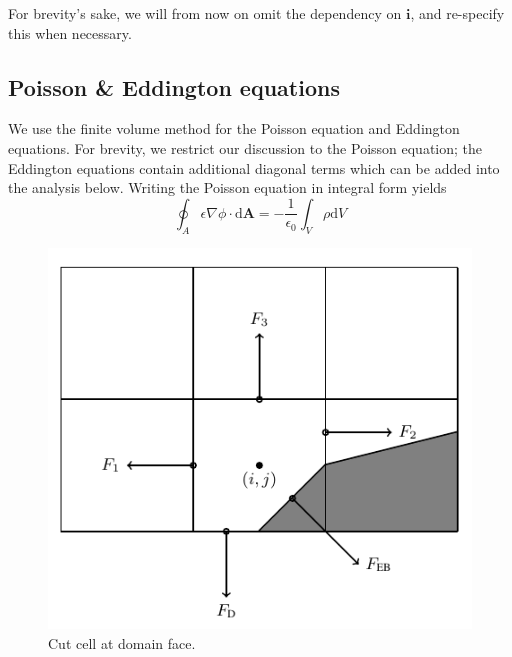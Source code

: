 \documentclass[3p]{elsarticle}
\def\diff{\ensuremath{\text{d}}}
\def\bmi{\ensuremath{\bm{i}}}
\begin{document}
For brevity's sake, we will from now on omit the dependency on $\bmi$, and re-specify this when necessary.

\subsection{Poisson \& Eddington equations}
\label{sec:poisson}
We use the finite volume method for the Poisson equation and Eddington equations. For brevity, we restrict our discussion to the Poisson equation; the Eddington equations contain additional diagonal terms which can be added into the analysis below. Writing the Poisson equation in integral form yields
\begin{equation}
  \oint_A \epsilon\nabla\phi\cdot\diff\bm{A} = -\frac{1}{\epsilon_0}\int_V\rho\diff V
\end{equation}

\begin{figure}[ht]
  \centering
  \includegraphics{./figures/cutCell}
  \caption{Cut cell at domain face.}
  \label{fig:cut_cell}
\end{figure}
\end{document}
